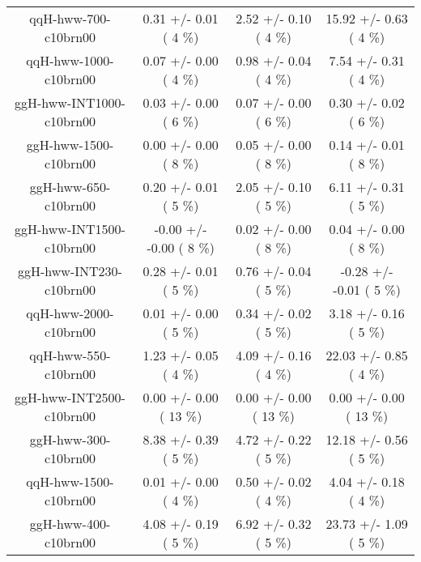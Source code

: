 \begin{table}[h!]
\begin{center}
{\begin{tabular}{
c| c | c | c | }
 qqH-hww-700-c10brn00   &       0.31 +/-       0.01 (         4 \%)   &       2.52 +/-       0.10 (         4 \%)   &      15.92 +/-       0.63 (         4 \%)  \\
 qqH-hww-1000-c10brn00   &       0.07 +/-       0.00 (         4 \%)   &       0.98 +/-       0.04 (         4 \%)   &       7.54 +/-       0.31 (         4 \%)  \\
 ggH-hww-INT1000-c10brn00   &       0.03 +/-       0.00 (         6 \%)   &       0.07 +/-       0.00 (         6 \%)   &       0.30 +/-       0.02 (         6 \%)  \\
 ggH-hww-1500-c10brn00   &       0.00 +/-       0.00 (         8 \%)   &       0.05 +/-       0.00 (         8 \%)   &       0.14 +/-       0.01 (         8 \%)  \\
 ggH-hww-650-c10brn00   &       0.20 +/-       0.01 (         5 \%)   &       2.05 +/-       0.10 (         5 \%)   &       6.11 +/-       0.31 (         5 \%)  \\
 ggH-hww-INT1500-c10brn00   &      -0.00 +/-      -0.00 (         8 \%)   &       0.02 +/-       0.00 (         8 \%)   &       0.04 +/-       0.00 (         8 \%)  \\
 ggH-hww-INT230-c10brn00   &       0.28 +/-       0.01 (         5 \%)   &       0.76 +/-       0.04 (         5 \%)   &      -0.28 +/-      -0.01 (         5 \%)  \\
 qqH-hww-2000-c10brn00   &       0.01 +/-       0.00 (         5 \%)   &       0.34 +/-       0.02 (         5 \%)   &       3.18 +/-       0.16 (         5 \%)  \\
 qqH-hww-550-c10brn00   &       1.23 +/-       0.05 (         4 \%)   &       4.09 +/-       0.16 (         4 \%)   &      22.03 +/-       0.85 (         4 \%)  \\
 ggH-hww-INT2500-c10brn00   &       0.00 +/-       0.00 (        13 \%)   &       0.00 +/-       0.00 (        13 \%)   &       0.00 +/-       0.00 (        13 \%)  \\
 ggH-hww-300-c10brn00   &       8.38 +/-       0.39 (         5 \%)   &       4.72 +/-       0.22 (         5 \%)   &      12.18 +/-       0.56 (         5 \%)  \\
 qqH-hww-1500-c10brn00   &       0.01 +/-       0.00 (         4 \%)   &       0.50 +/-       0.02 (         4 \%)   &       4.04 +/-       0.18 (         4 \%)  \\
 ggH-hww-400-c10brn00   &       4.08 +/-       0.19 (         5 \%)   &       6.92 +/-       0.32 (         5 \%)   &      23.73 +/-       1.09 (         5 \%)  \\
\hline

\end{tabular}
}
\end{center}
\end{table}

